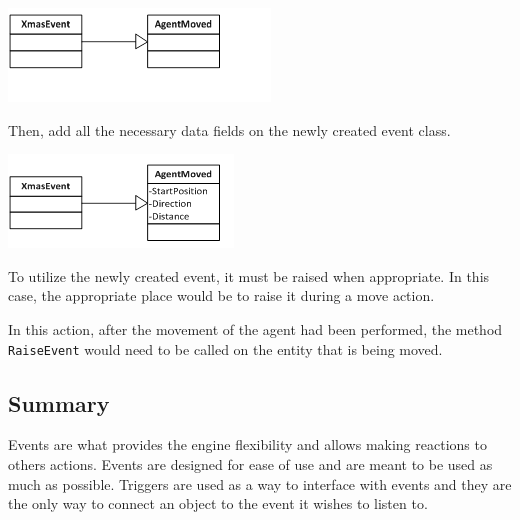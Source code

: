 \includegraphics{XmasEventCreationStepOne}

Then, add all the necessary data fields on the newly created event
class.

\includegraphics{XmasEventCreationStepTwo}

To utilize the newly created event, it must be raised when appropriate.
In this case, the appropriate place would be to raise it during a
move action.

In this action, after the movement of the agent had been performed,
the method \texttt{RaiseEvent} would need to be called on the entity
that is being moved.


\subsection*{Summary}

Events are what provides the engine flexibility and allows making
reactions to others actions. Events are designed for ease of use and
are meant to be used as much as possible. Triggers are used as a way
to interface with events and they are the only way to connect an object
to the event it wishes to listen to.
